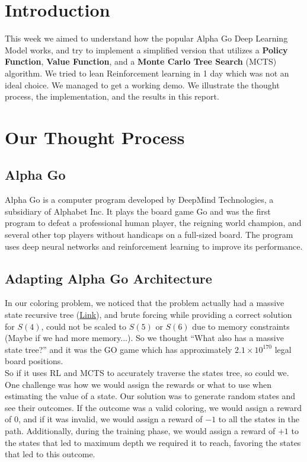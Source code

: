 \documentclass[12pt]{article}
\begin{document}

\tableofcontents
\newpage

\section{Introduction}
This week we aimed to understand how the popular Alpha Go Deep Learning Model works, and try to implement a simplified version that utilizes a \textbf{Policy Function}, \textbf{Value Function}, and a \textbf{Monte Carlo Tree Search} (MCTS) algorithm. 
We tried to lean Reinforcement learning in 1 day which was not an ideal choice. We managed to get a working demo. We illustrate the thought process, the implementation, and the results in this report.

\section{Our Thought Process}
\subsection{Alpha Go}
Alpha Go is a computer program developed by DeepMind Technologies, a subsidiary of Alphabet Inc. It plays the board game Go and was the first program to defeat a professional human player, the reigning world champion, and several other top players without handicaps on a full-sized board. The program uses deep neural networks and reinforcement learning to improve its performance.
\subsection{Adapting Alpha Go Architecture}
In our coloring problem, we noticed that the problem actually had a massive state recursive tree (\href{https://github.com/Abdulrhman-shaheen/CSE326-Schur-Numbers-/blob/master/Week8/tex/images/recursionTree.png}{\underline{Link}}), and brute forcing while providing a correct solution for $S(4)$, could not be scaled to $S(5)$ or $S(6)$ due to memory constraints (Maybe if we had more memory...). So we thought ``What also has a massive state tree?'' and it was the GO game which has approximately $2.1 \times 10^{170}$ legal board positions. \\
So if it uses RL and MCTS to accurately traverse the states tree, so could we. One challenge was how we would assign the rewards or what to use when estimating the value of a state. Our solution was to generate random states and see their outcomes. If the outcome was a valid coloring, we would assign a reward of $0$, and if it was invalid, we would assign a reward of $-1$ to all the states in the path. Additionally, during the training phase, we would assign a reward of $+1$ to the states that led to maximum depth we required it to reach, favoring the states that led to this outcome.  
\end{document}
